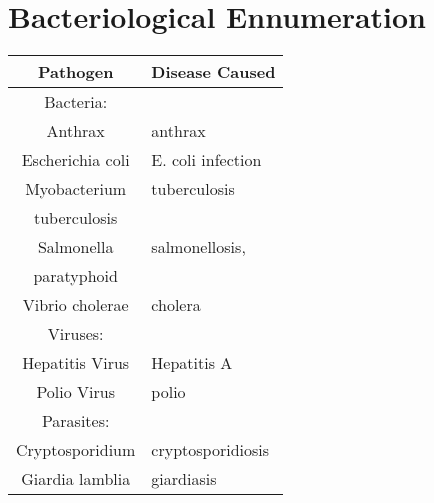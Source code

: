 \section{Bacteriological Ennumeration}

\begin{tabular}{|c||l|}
\hline
\multicolumn{1}{|c|}{Pathogen} & \multicolumn{1}{c|}{Disease Caused} \\
\hline
Bacteria: &  \\
\hline\hline
Anthrax & anthrax \\
\hline\hline
Escherichia coli & E. coli infection \\
\hline\hline
Myobacterium & tuberculosis \\
tuberculosis &  \\
\hline\hline
Salmonella & salmonellosis, \\
paratyphoid &  \\
\hline\hline
Vibrio cholerae & cholera \\
\hline\hline
Viruses: &  \\
\hline\hline
Hepatitis Virus & Hepatitis A \\
\hline\hline
Polio Virus & polio \\
\hline\hline
Parasites: &  \\
\hline\hline
Cryptosporidium & cryptosporidiosis \\
\hline\hline
Giardia lamblia & giardiasis \\
\hline\hline
\end{tabular}

